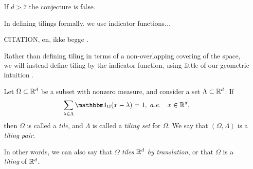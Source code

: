 \documentclass[../thesis.tex]{subfiles}
\begin{document}
If $d>7$ the conjecture is false. 










In defining tilings formally, we use indicator functions... 

CITATION, en, ikke begge \cite{kolountzakisTilingsTranslation2010} \cite{kolountzakisStudyTranslationalTiling2003}. 


Rather than defining tiling in terms of a non-overlapping covering of the space, we will instead define tiling by the indicator function, using little of our geometric intuition \cite{kolountzakisTilingsTranslation2010} \cite{kolountzakisStudyTranslationalTiling2003}. 

\begin{definition}
    Let $\Omega \subset \mathbb{R}^d$ be a subset with nonzero measure, and consider a  set $\Lambda \subset \mathbb{R}^d$. If
    \begin{equation}\label{eq:tiling_set}
        \sum_{\lambda \in \Lambda} \indicator{\Omega}{x-\lambda} = 1, \text{\space} a.e. \quad x \in \R^d,
    \end{equation}
    then $\Omega$ is called a \emph{tile}, and $\Lambda$ is called a \emph{tiling set} for $\Omega$. We say that $(\Omega, \Lambda)$ is a \emph{tiling pair}.
\end{definition}
In other words, we can also say that $\Omega$ \emph{tiles $\mathbb{R}^d$ by translation}, or that $\Omega$ is a \emph{tiling} of $\mathbb{R}^d$. 
\end{document}
